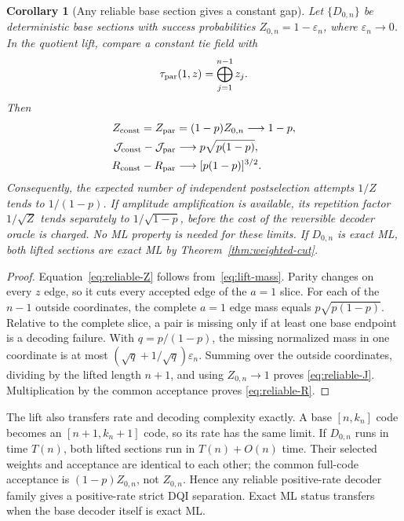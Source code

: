 \documentclass[journal]{IEEEtran}
\newtheorem{corollary}[theorem]{Corollary}
\theoremstyle{definition}
\theoremstyle{remark}
\begin{document}
\begin{corollary}[Any reliable base section gives a constant gap]
\label{cor:reliable}
Let $\{D_{0,n}\}$ be deterministic base sections with success probabilities
$Z_{0,n}=1-\varepsilon_n$, where $\varepsilon_n\to0$.  In the quotient lift,
compare a constant tie field with
\begin{equation}
 \tau_{\rm par}(1,z)=\bigoplus_{j=1}^{n-1}z_j.
 \label{eq:parity-field}
\end{equation}
Then
\begin{align}
 Z_{\rm const}=Z_{\rm par}
  &=(1-p)Z_{0,n}\longrightarrow1-p,
 \label{eq:reliable-Z}\\
 \mathcal J_{\rm const}-\mathcal J_{\rm par}
  &\longrightarrow p\sqrt{p(1-p)},
 \label{eq:reliable-J}\\
 R_{\rm const}-R_{\rm par}
  &\longrightarrow[p(1-p)]^{3/2}.
 \label{eq:reliable-R}
\end{align}
Consequently, the expected number of independent postselection attempts
$1/Z$ tends to $1/(1-p)$.  If amplitude amplification is available, its
repetition factor $1/\sqrt Z$ tends separately to $1/\sqrt{1-p}$, before the
cost of the reversible decoder oracle is charged.
No ML property is needed for these limits.  If $D_{0,n}$ is exact ML, both
lifted sections are exact ML by Theorem~\ref{thm:weighted-cut}.
\end{corollary}

\begin{proof}
Equation~\eqref{eq:reliable-Z} follows from~\eqref{eq:lift-mass}.  Parity
changes on every $z$ edge, so it cuts every accepted edge of the $a=1$ slice.
For each of the $n-1$ outside coordinates, the complete $a=1$ edge mass equals
$p\sqrt{p(1-p)}$.  Relative to the complete slice, a pair is missing only if
at least one base endpoint is a decoding failure.  With $q=p/(1-p)$, the
missing normalized mass in one coordinate is at most
$(\sqrt q+1/\sqrt q)\varepsilon_n$.  Summing over the outside coordinates,
dividing by the lifted length $n+1$, and using $Z_{0,n}\to1$ proves
\eqref{eq:reliable-J}.  Multiplication by the common acceptance proves
\eqref{eq:reliable-R}.
\end{proof}

The lift also transfers rate and decoding complexity exactly.  A base
$[n,k_n]$ code becomes an $[n+1,k_n+1]$ code, so its rate has the same limit.
If $D_{0,n}$ runs in time $T(n)$, both lifted sections run in
$T(n)+O(n)$ time.  Their selected weights and acceptance are identical to
each other; the common full-code acceptance is $(1-p)Z_{0,n}$, not
$Z_{0,n}$.  Hence any reliable positive-rate decoder family gives a
positive-rate strict DQI separation.  Exact ML status transfers when the base
decoder itself is exact ML.
\end{document}
